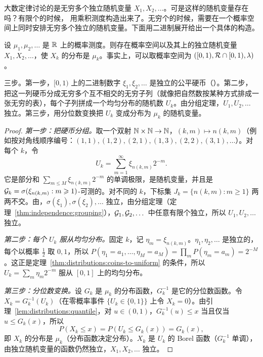 大数定律讨论的是无穷多个独立随机变量 $X_1,X_2,\dots$。可是这样的随机变量存在吗？有限个的时候， 用乘积测度构造出来了。无穷个的时候，需要在一个概率空间上同时安排无穷多个独立的随机变量。下面用二进制展开给出一个具体的构造。

\begin{theorem}[独立随机变量序列的存在性]\label{thm:independence:existence}
设 $\mu_1,\mu_2,\dots$ 是 $\mathbb{R}$ 上的概率测度。则存在概率空间以及其上的独立随机变量 $X_1,X_2,\dots$，使 $X_k$ 的分布是 $\mu_k$。事实上，可以取概率空间为 $([0,1),\mathcal{R}\cap[0,1),\lambda)$。
\end{theorem}

\begin{remark}[证明思路]
三步。第一步，$[0,1)$ 上的二进制数字 $\xi_1,\xi_2,\dots$ 是独立的公平硬币（）。第二步，把这一列硬币分成无穷多个互不相交的无穷子列（就像把自然数按某种方式排成一张无穷的表），每个子列拼成一个均匀分布的随机数 $U_k$。由分组定理，$U_1,U_2,\dots$ 独立。第三步，用分位数变换把 $U_k$ 变成分布为 $\mu_k$ 的随机变量。
\end{remark}

\begin{proof}
\emph{第一步：把硬币分组。}取一个双射 $\mathbb{N}\times\mathbb{N}\to\mathbb{N}$，$(k,m)\mapsto n(k,m)$（例如按对角线顺序编号：$(1,1),(1,2),(2,1),(1,3),(2,2),(3,1),\dots$）。对每个 $k$，令
\[
U_k=\sum_{m=1}^\infty\xi_{n(k,m)}2^{-m}.
\]
它是部分和 $\sum_{m\leqslant M}\xi_{n(k,m)}2^{-m}$ 的单调极限，是随机变量，并且是 $\mathcal{G}_k=\sigma(\xi_{n(k,m)}:m\geqslant1)$-可测的。对不同的 $k$，下标集 $J_k=\{n(k,m):m\geqslant1\}$ 两两不交。由，$\sigma(\xi_1),\sigma(\xi_2),\dots$ 独立，由分组定理（定理~\ref{thm:independence:grouping}），$\mathcal{G}_1,\mathcal{G}_2,\dots$ 中任意有限个独立，所以 $U_1,U_2,\dots$ 独立。

\emph{第二步：每个 $U_k$ 服从均匀分布。}固定 $k$，记 $\eta_m=\xi_{n(k,m)}$。$\eta_1,\eta_2,\dots$ 是独立的，每个以概率 $\frac12$ 取 $0,1$，所以 $P(\eta_1=a_1,\dots,\eta_M=a_M)=\prod_mP(\eta_m=a_m)=2^{-M}$。这正是定理~\ref{thm:distributions:coins-to-uniform} 的条件，所以 $U_k=\sum_m\eta_m2^{-m}$ 服从 $[0,1]$ 上的均匀分布。

\emph{第三步：分位数变换。}设 $G_k$ 是 $\mu_k$ 的分布函数，$G_k^{-1}$ 是它的分位数函数。令 $X_k=G_k^{-1}(U_k)$（在零概率事件 $\{U_k\in\{0,1\}\}$ 上令 $X_k=0$）。由引理~\ref{lem:distributions:quantile}，对 $u\in(0,1)$，$G_k^{-1}(u)\leqslant x$ 当且仅当 $u\leqslant G_k(x)$，所以
\[
P(X_k\leqslant x)=P(U_k\leqslant G_k(x))=G_k(x),
\]
即 $X_k$ 的分布是 $\mu_k$（分布函数决定分布）。$X_k$ 是 $U_k$ 的 Borel 函数（$G_k^{-1}$ 单调），由独立随机变量的函数仍然独立，$X_1,X_2,\dots$ 独立。
\end{proof}

